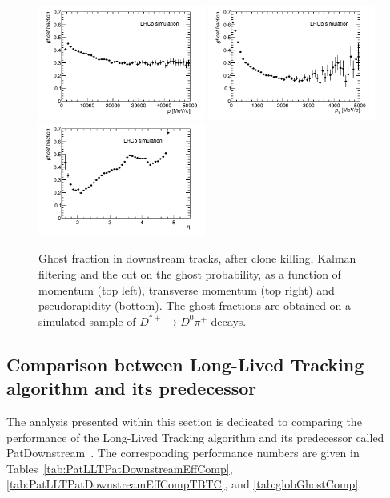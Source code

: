 \begin{figure}[tbph]
\begin{center}
\includegraphics[width =0.49\textwidth]{figures/EffPatLLT/overall/DstD0piGhostFracP_TBTC.png} 
\includegraphics[width =0.49\textwidth]{figures/EffPatLLT/overall/DstD0piGhostFracPt_TBTC.png}
\includegraphics[width =0.49\textwidth]{figures/EffPatLLT/overall/DstD0piGhostFracEta_TBTC.png} 
\caption{Ghost fraction in downstream tracks, after clone killing, Kalman filtering and the cut on the ghost probability, as a function of momentum (top left), transverse momentum (top right) and pseudorapidity (bottom). The ghost fractions are obtained on a simulated sample of $D^{*+} \rightarrow D^{0}\pi^+$ decays.}
\label{fig:ghostsPatLLTDstD0pi_TBTC}
 \end{center}
 \end{figure}

\subsection{Comparison between Long-Lived Tracking algorithm and its predecessor}
The analysis presented within this section is dedicated to comparing the performance of the Long-Lived Tracking algorithm and its predecessor called PatDownstream~\cite{PatDownstream}. The corresponding performance numbers are given in Tables~\ref{tab:PatLLTPatDownstreamEffComp}, \ref{tab:PatLLTPatDownstreamEffCompTBTC}, and \ref{tab:globGhostComp}. 

